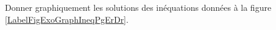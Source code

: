 
\begin{exercice}\label{exoSeconde-0071}


%

Donner graphiquement les solutions des inéquations données à la figure \ref{LabelFigExoGraphIneqPgErDr}. %
\newcommand{\CaptionFigExoGraphIneqPgErDr}{
    inéquations pour l'exercice \ref{exoSeconde-0071}.}




\end{exercice}
